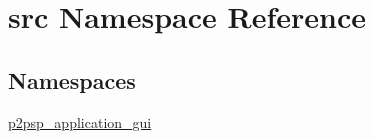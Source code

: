 \hypertarget{namespacesrc}{}\section{src Namespace Reference}
\label{namespacesrc}
\subsection*{Namespaces}
\begin{DoxyCompactItemize}
\item 
 \hyperlink{namespacesrc_1_1p2psp__application__gui}{p2psp\+\_\+application\+\_\+gui}
\end{DoxyCompactItemize}
